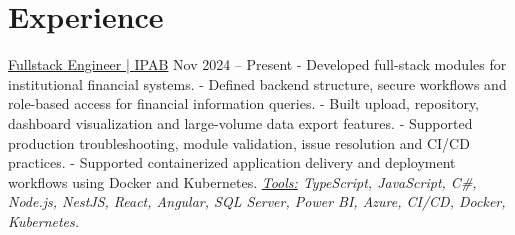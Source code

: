 \documentclass[letterpaper]{twentysecondcv}
\begin{document}



\makeprofile


\section{Experience}

{\large\underline{Fullstack Engineer | IPAB}} \hfill Nov 2024 -- Present
\newline
\newline- Developed full-stack modules for institutional financial systems.
\newline- Defined backend structure, secure workflows and role-based access for financial information queries.
\newline- Built upload, repository, dashboard visualization and large-volume data export features.
\newline- Supported production troubleshooting, module validation, issue resolution and CI/CD practices.
\newline- Supported containerized application delivery and deployment workflows using Docker and Kubernetes.
\newline
\newline\textit{\underline{Tools:} TypeScript, JavaScript, C\#, Node.js, NestJS, React, Angular, SQL Server, Power BI, Azure, CI/CD, Docker, Kubernetes.}
\newline
\end{document}
